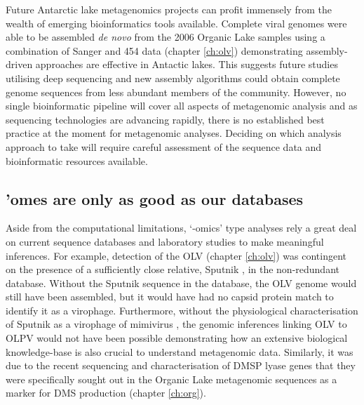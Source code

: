 Future Antarctic lake metagenomics projects can profit immensely from the wealth of emerging bioinformatics tools available.
Complete viral genomes were able to be assembled \emph{de novo} from the 2006 Organic Lake samples using a combination of Sanger and 454 data (chapter \ref{ch:olv}) demonstrating assembly-driven approaches are effective in Antactic lakes.
This suggests future studies utilising deep sequencing and new assembly algorithms could obtain complete genome sequences from less abundant members of the community.
However, no single bioinformatic pipeline will cover all aspects of metagenomic analysis and as sequencing technologies are advancing rapidly, there is no established best practice at the moment for metagenomic analyses.
Deciding on which analysis approach to take will require careful assessment of the sequence data and bioinformatic resources available.

\subsection{ 'omes are only as good as our databases}
Aside from the computational limitations, `-omics' type analyses rely a great deal on current sequence databases and laboratory studies to make meaningful inferences.
For example, detection of the \ac{OLV} (chapter \ref{ch:olv}) was contingent on the presence of a sufficiently close relative, Sputnik \cite{LaScola2008}, in the non-redundant database.
Without the Sputnik sequence in the database, the \ac{OLV} genome would still have been assembled, but it would have had no capsid protein match to identify it as a virophage.
Furthermore, without the physiological characterisation of Sputnik as a virophage of mimivirus \cite{LaScola2008}, the genomic inferences linking \ac{OLV} to \ac{OLPV} would not have been possible demonstrating how an extensive biological knowledge-base is also crucial to understand metagenomic data.
Similarly, it was due to the recent sequencing and characterisation of \ac{DMSP} lyase genes \cite{Curson2011b} that they were specifically sought out in the Organic Lake metagenomic sequences as a marker for \ac{DMS} production (chapter \ref{ch:org}).

